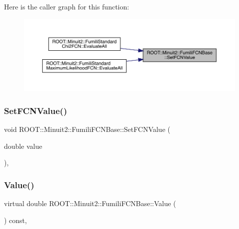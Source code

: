 Here is the caller graph for this function\+:\nopagebreak
\begin{figure}[H]
\begin{center}
\leavevmode
\includegraphics[width=350pt]{de/dc5/classROOT_1_1Minuit2_1_1FumiliFCNBase_a537ad24d5584bd089c14ee92567ddd72_icgraph}
\end{center}
\end{figure}
\mbox{\label{classROOT_1_1Minuit2_1_1FumiliFCNBase_a537ad24d5584bd089c14ee92567ddd72}} 
\subsubsection{\texorpdfstring{SetFCNValue()}{SetFCNValue()}\hspace{0.1cm}{\footnotesize\ttfamily [2/2]}}
{\footnotesize\ttfamily void R\+O\+O\+T\+::\+Minuit2\+::\+Fumili\+F\+C\+N\+Base\+::\+Set\+F\+C\+N\+Value (\begin{DoxyParamCaption}\item[{double}]{value }\end{DoxyParamCaption})\hspace{0.3cm}{\ttfamily [inline]}, {\ttfamily [protected]}}

\mbox{\label{classROOT_1_1Minuit2_1_1FumiliFCNBase_a221dacee0ccde747a271a0cecd759f98}} 
\subsubsection{\texorpdfstring{Value()}{Value()}\hspace{0.1cm}{\footnotesize\ttfamily [1/2]}}
{\footnotesize\ttfamily virtual double R\+O\+O\+T\+::\+Minuit2\+::\+Fumili\+F\+C\+N\+Base\+::\+Value (\begin{DoxyParamCaption}{ }\end{DoxyParamCaption}) const\hspace{0.3cm}{\ttfamily [inline]}, {\ttfamily [virtual]}}

